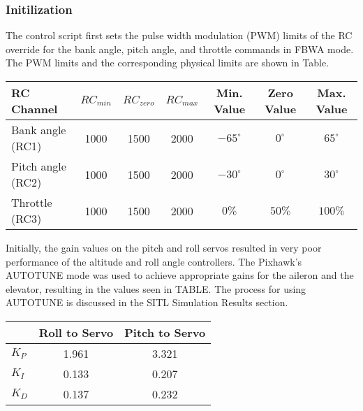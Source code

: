 \documentclass{aiaa}
\begin{document}

\subsubsection{Initilization}


The control script first sets the pulse width modulation (PWM) limits of the RC override for the bank angle, pitch angle, and throttle commands in FBWA mode. The PWM limits and the corresponding physical limits are shown in Table.

\begin{center}
\begin{tabular}{ l| c | c | c | c| c | c}
	
     RC Channel & $RC_{min}$ & $RC_{zero}$ & $RC_{max}$ & Min. Value & Zero Value & Max. Value \\
    \hline \hline
    Bank angle (RC1) & 1000 & 1500 & 2000 & $-65^{\circ}$ & $0^{\circ}$ & $65^{\circ}$\\
    \hline
    
    Pitch angle (RC2) & 1000 & 1500 & 2000 & $-30^{\circ}$ & $0^{\circ}$ & $30^{\circ}$\\
    \hline
    
    Throttle (RC3) & 1000 & 1500 & 2000 & $0\%$ & $50\%$ & $100\%$ \\
    \hline


\end{tabular}
\end{center}

Initially, the gain values on the pitch and roll servos resulted in very poor performance of the altitude and roll angle controllers. The Pixhawk's AUTOTUNE mode was used to achieve appropriate gains for the aileron and the elevator, resulting in the values seen in TABLE. The process for using AUTOTUNE is discussed in the SITL Simulation Results section.

\begin{center}
\begin{tabular}{ l| c | c }
	
      & Roll to Servo & Pitch to Servo \\
    \hline \hline
    $K_P$ & 1.961 & 3.321\\
    \hline
    
    $K_I$ & 0.133 & 0.207 \\
    \hline
    
    $K_D$ & 0.137 & 0.232 \\
    \hline


\end{tabular}
\end{center}
\end{document}
